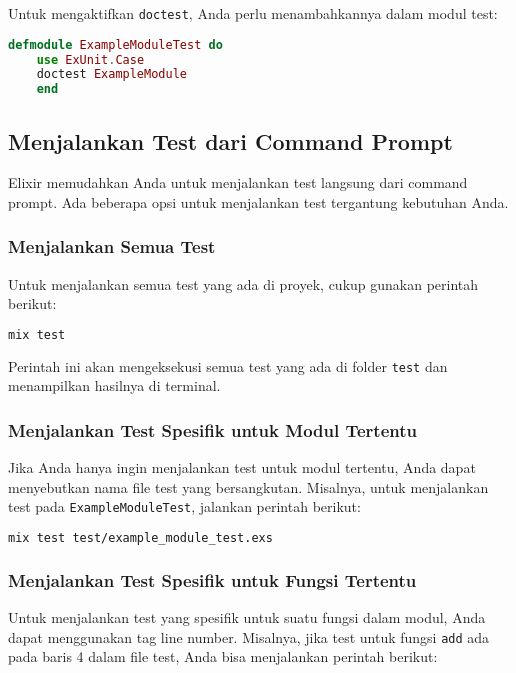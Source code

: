 Untuk mengaktifkan \texttt{doctest}, Anda perlu menambahkannya dalam modul test:

\begin{lstlisting}[language=Elixir]
	defmodule ExampleModuleTest do
	use ExUnit.Case
	doctest ExampleModule
	end
\end{lstlisting}

\subsection{Menjalankan Test dari Command Prompt}

Elixir memudahkan Anda untuk menjalankan test langsung dari command prompt. Ada beberapa opsi untuk menjalankan test tergantung kebutuhan Anda.

\subsubsection{Menjalankan Semua Test}

Untuk menjalankan semua test yang ada di proyek, cukup gunakan perintah berikut:

\begin{lstlisting}[language=Bash]
	mix test
\end{lstlisting}

Perintah ini akan mengeksekusi semua test yang ada di folder \texttt{test} dan menampilkan hasilnya di terminal.

\subsubsection{Menjalankan Test Spesifik untuk Modul Tertentu}

Jika Anda hanya ingin menjalankan test untuk modul tertentu, Anda dapat menyebutkan nama file test yang bersangkutan. Misalnya, untuk menjalankan test pada \texttt{ExampleModuleTest}, jalankan perintah berikut:

\begin{lstlisting}[language=Bash]
	mix test test/example_module_test.exs
\end{lstlisting}

\subsubsection{Menjalankan Test Spesifik untuk Fungsi Tertentu}

Untuk menjalankan test yang spesifik untuk suatu fungsi dalam modul, Anda dapat menggunakan tag line number. Misalnya, jika test untuk fungsi \texttt{add} ada pada baris 4 dalam file test, Anda bisa menjalankan perintah berikut:

